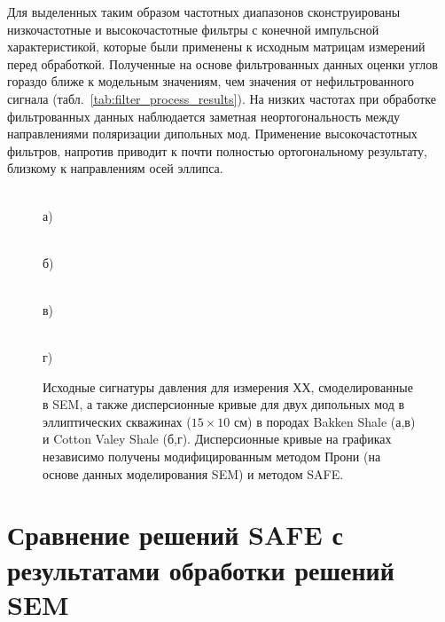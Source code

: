 \documentclass[a4paper,11pt]{article}
\begin{document}
Для выделенных таким образом частотных диапазонов сконструированы низкочастотные и высокочастотные фильтры с конечной импульсной характеристикой, которые были применены к исходным матрицам измерений перед обработкой. Полученные на основе фильтрованных данных оценки углов гораздо ближе к модельным значениям, чем значения от нефильтрованного сигнала (табл.~\ref{tab:filter_process_results}). На низких частотах при обработке фильтрованных данных наблюдается заметная неортогональность между направлениями поляризации дипольных мод. Применение высокочастотных фильтров, напротив приводит к почти полностью ортогональному результату, близкому к направлениям осей эллипса. 

\begin{figure}[h]
	\centering
	\begin{minipage}{0.49\linewidth}
		\centering %
		 \\
		а)
	\end{minipage}
	\begin{minipage}{0.49\linewidth}
		\centering %
		 \\
		б)
	\end{minipage}
	\begin{minipage}{0.49\linewidth}
		\centering %
		 \\
		в)
	\end{minipage}
	\begin{minipage}{0.49\linewidth}
		\centering %
		 \\
		г)
	\end{minipage}
	\caption{\footnotesize Исходные сигнатуры давления для измерения ХХ, смоделированные в SEM, а также дисперсионные кривые для двух дипольных мод в эллиптических скважинах ($15 \times 10$ см) в породах Bakken Shale (а,в) и Cotton Valey Shale (б,г). Дисперсионные кривые на графиках независимо получены модифицированным методом Прони (на основе данных моделирования SEM) и методом SAFE. }
	\label{fig:disp_curves_all}
\end{figure}

\section{Сравнение решений SAFE с результатами обработки решений SEM}
\label{safe_comparison}
\end{document}
